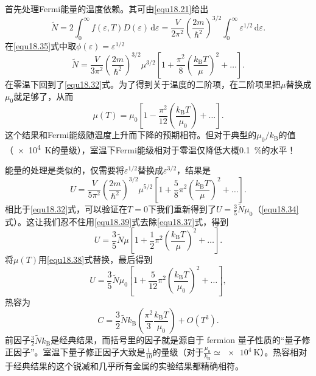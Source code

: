 首先处理Fermi能量的温度依赖。其可由\eqref{equ18.21}给出%
\begin{equation}
\tilde N=2\int_0^\infty f(\varepsilon,T)D(\varepsilon)\,\mathrm d\varepsilon=\frac{V}{2\pi^2}\left(\frac{2m}{\hbar^2}\right)^{3/2}\int_0^\infty\varepsilon^{1/2}\,\mathrm d\varepsilon .
\end{equation}
在\ref{equ18.35}式中取$\phi(\varepsilon)=\varepsilon^{1/2}$
\begin{equation}
\tilde N=\frac{V}{3\pi^2}\left(\frac{2m}{\hbar^2}\right)^{3/2}\mu^{3/2}\left[1+\frac{\pi^2}{8}\left(\frac{k_\text{B}T}{\mu}\right)^2+\dots\right].
\label{equ18.37}
\end{equation}
在零温下回到了\eqref{equ18.32}式。为了得到关于温度的二阶项，在二阶项里把$\mu$替换成$\mu_0$就足够了，从而
\begin{equation}
\mu(T)=\mu_0\left[1-\frac{\pi^2}{12}\left(\frac{k_\text{B}T}{\mu_0}\right)+\dots\right].
\label{equ18.38}
\end{equation}
这个结果和Fermi能级随温度上升而下降的预期相符。但对于典型的$\mu_0/k_\text{B}$的值（\SI{e4}{\kelvin}的量级），室温下Fermi能级相对于零温仅降低大概\SI{0.1}{\percent}的水平！

能量的处理是类似的，仅需要将$\varepsilon^{1/2}$替换成$\varepsilon^{3/2}$，结果是
\begin{equation}
U=\frac{V}{5\pi^2}\left(\frac{2m}{\hbar^2}\right)^{3/2}\mu^{5/2}\left[1+\frac{5}{8}\pi^2\left(\frac{k_\text{B}T}{\mu}\right)^2+\dots\right].
\label{equ18.39}
\end{equation}
相比于\eqref{equ18.32}式，可以验证在$T=0$下我们重新得到了$U=\frac{3}{5}\tilde N\mu_0$（\eqref{equ18.34}式）。这让我们忍不住用\eqref{equ18.39}式去除\eqref{equ18.37}式，得到
\begin{equation}
U=\frac{3}{5}\tilde N\mu\left[1+\frac{1}{2}\pi^2\left(\frac{k_\text{B}T}{\mu}\right)^2+\dots\right].
\end{equation}
将$\mu(T)$用\eqref{equ18.38}式替换，最后得到
\begin{equation}
U=\frac{3}{5}\tilde N\mu_0\left[1+\frac{5}{12}\pi^2\left(\frac{k_\text{B}T}{\mu_0}\right)^2+\dots\right],
\end{equation}
热容为
\begin{equation}
C=\frac{3}{2}\tilde Nk_\text{B}\left(\frac{\pi^2}{3}\frac{k_\text{B}T}{\mu_0}\right)+O(T^3).
\label{equ18.42}
\end{equation}
前因子$\frac{3}{2}\tilde Nk_\text{B}$是经典结果，而括号里的因子就是源自于 fermion 量子性质的``量子修正因子''。室温下量子修正因子大致是$\frac{1}{10}$的量级（对于$\frac{\mu_0}{k_\text{B}}\simeq\SI{e4}{\kelvin}$）。热容相对于经典结果的这个锐减和几乎所有金属的实验结果都精确相符。

